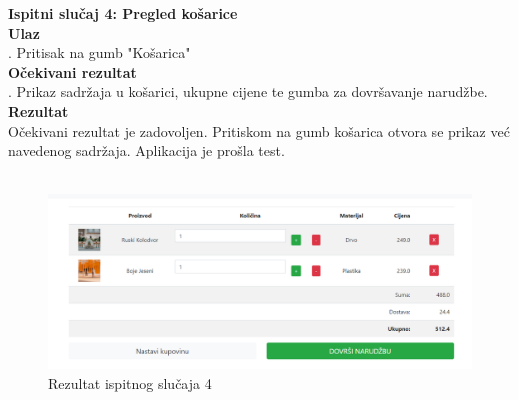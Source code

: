 {			\noindent \textbf{Ispitni slučaj 4: Pregled košarice}
			\\
			\textbf{Ulaz}
			\\
			. Pritisak na gumb "Košarica" \\
			\textbf{Očekivani rezultat}
			\\
			. Prikaz sadržaja u košarici, ukupne cijene te gumba za dovršavanje narudžbe. \\
			\textbf{Rezultat}
			\\
			\indent Očekivani rezultat je zadovoljen. Pritiskom na gumb košarica otvora se prikaz već navedenog sadržaja. Aplikacija je prošla test.
			\\ \\
			\begin{figure}[H]
				\centering
				\includegraphics[scale=0.34]{"slike/test4"}
				\caption{Rezultat ispitnog slučaja 4}
				\label{fig:rezultat-ispitnog-slucaja-4}
			\end{figure}
			
}
